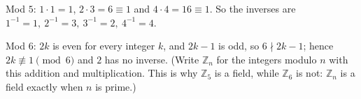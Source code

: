 Mod $5$: $1\cdot1=1$, $2\cdot3=6\equiv1$ and $4\cdot4=16\equiv1$. So the inverses are $\boxed{1^{-1}=1,\ 2^{-1}=3,\ 3^{-1}=2,\ 4^{-1}=4}$.

Mod $6$: $2k$ is even for every integer $k$, and $2k-1$ is odd, so $6\nmid2k-1$; hence $2k\not\equiv1\pmod6$ and $2$ has no inverse. (Write $\mathbb{Z}_n$ for the integers modulo $n$ with this addition and multiplication. This is why $\mathbb{Z}_5$ is a field, while $\mathbb{Z}_6$ is not: $\mathbb{Z}_n$ is a field exactly when $n$ is prime.)
